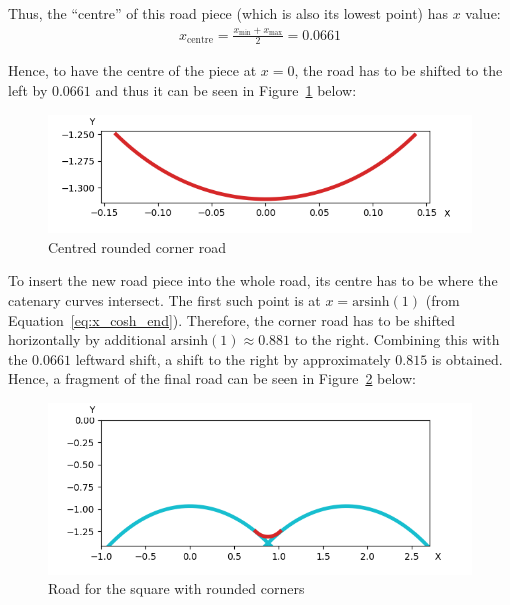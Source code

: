 \documentclass[12pt]{article}
\begin{document}
        Thus, the ``centre'' of this road piece (which is also its lowest point) has $x$ value:
        \begin{align}
            x_{\text{centre}} = \frac{x_{\text{min}}+x_{\text{max}}}{2} = 0.0661
        \end{align}

        Hence, to have the centre of the piece at $x=0$, the road has to be shifted to the left by $0.0661$ and thus it can be seen in Figure~\ref{fig:corner_road_centered} below:
        \begin{figure}[H]
            \includegraphics[width=\linewidth]{images/centered_corner_road.png}
            \caption{Centred rounded corner road}\label{fig:corner_road_centered}
        \end{figure}

        To insert the new road piece into the whole road, its centre has to be where the catenary curves intersect. The first such point is at $x=\text{arsinh}(1)$ (from Equation~\ref{eq:x_cosh_end}). Therefore, the corner road has to be shifted horizontally by additional $\text{arsinh}(1) \approx 0.881$ to the right. Combining this with the $0.0661$ leftward shift, a shift to the right by approximately $0.815$ is obtained. Hence, a fragment of the final road can be seen in Figure~\ref{fig:corner_road_full} below:
        \begin{figure}[H]
            \includegraphics[width=\linewidth]{images/road_with_corner.png}
            \caption{Road for the square with rounded corners}\label{fig:corner_road_full}
        \end{figure}
\end{document}
